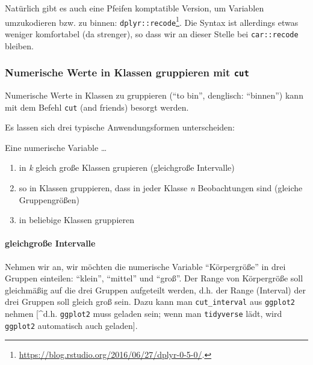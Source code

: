 \documentclass[12pt,]{book}
\providecommand{\tightlist}{%
  \setlength{\itemsep}{0pt}\setlength{\parskip}{0pt}}
\let\oldparagraph\paragraph
\renewcommand{\paragraph}[1]{\oldparagraph{#1}\mbox{}}
\let\rmarkdownfootnote\footnote%
\def\footnote{\protect\rmarkdownfootnote}
\begin{document}
Natürlich gibt es auch eine Pfeifen komptatible Version, um Variablen
umzukodieren bzw. zu binnen: \texttt{dplyr::recode}\footnote{\url{https://blog.rstudio.org/2016/06/27/dplyr-0-5-0/}.}.
Die Syntax ist allerdings etwas weniger komfortabel (da strenger), so
dass wir an dieser Stelle bei \texttt{car::recode} bleiben.

\subsubsection{\texorpdfstring{Numerische Werte in Klassen gruppieren
mit
\texttt{cut}}{Numerische Werte in Klassen gruppieren mit cut}}\label{numerische-werte-in-klassen-gruppieren-mit-cut}

Numerische Werte in Klassen zu gruppieren (``to bin'', denglisch:
``binnen'') kann mit dem Befehl \texttt{cut} (and friends) besorgt
werden.

Es lassen sich drei typische Anwendungsformen unterscheiden:

Eine numerische Variable \ldots{}

\begin{enumerate}
\def\labelenumi{\arabic{enumi}.}
\tightlist
\item
  in \emph{k} gleich große Klassen grupieren (gleichgroße Intervalle)
\item
  so in Klassen gruppieren, dass in jeder Klasse \emph{n} Beobachtungen
  sind (gleiche Gruppengrößen)
\item
  in beliebige Klassen gruppieren
\end{enumerate}

\paragraph{gleichgroße Intervalle}\label{gleichgroe-intervalle}

Nehmen wir an, wir möchten die numerische Variable ``Körpergröße'' in
drei Gruppen einteilen: ``klein'', ``mittel'' und ``groß''. Der Range
von Körpergröße soll gleichmäßig auf die drei Gruppen aufgeteilt werden,
d.h. der Range (Interval) der drei Gruppen soll gleich groß sein. Dazu
kann man \texttt{cut\_interval} aus \texttt{ggplot2} nehmen {[}\^{}d.h.
\texttt{ggplot2} muss geladen sein; wenn man \texttt{tidyverse} lädt,
wird \texttt{ggplot2} automatisch auch geladen{]}.
\end{document}
